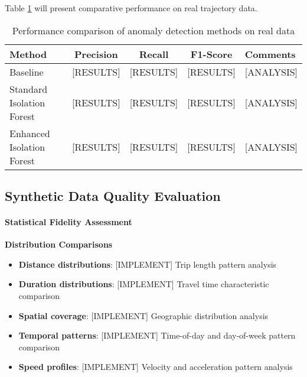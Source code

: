 \documentclass[runningheads]{llncs}
\begin{document}

Table \ref{tab:evaluation-results} will present comparative performance on real trajectory data.

\begin{table}[h]
\centering
\begin{tabular}{l|c|c|c|l}
\textbf{Method} & \textbf{Precision} & \textbf{Recall} & \textbf{F1-Score} & \textbf{Comments} \\ \hline
Baseline & [RESULTS] & [RESULTS] & [RESULTS] & [ANALYSIS] \\
Standard Isolation Forest & [RESULTS] & [RESULTS] & [RESULTS] & [ANALYSIS] \\
Enhanced Isolation Forest & [RESULTS] & [RESULTS] & [RESULTS] & [ANALYSIS] \\
\end{tabular}
\caption{Performance comparison of anomaly detection methods on real data}
\label{tab:evaluation-results}
\end{table}


\subsection{Synthetic Data Quality Evaluation}
\label{sec:synthetic-eval}


\paragraph{Statistical Fidelity Assessment}

\textbf{Distribution Comparisons}
\begin{itemize}
\item \textbf{Distance distributions}: [IMPLEMENT] Trip length pattern analysis
\item \textbf{Duration distributions}: [IMPLEMENT] Travel time characteristic comparison
\item \textbf{Spatial coverage}: [IMPLEMENT] Geographic distribution analysis
\item \textbf{Temporal patterns}: [IMPLEMENT] Time-of-day and day-of-week pattern comparison
\item \textbf{Speed profiles}: [IMPLEMENT] Velocity and acceleration pattern analysis
\end{itemize}
\end{document}
